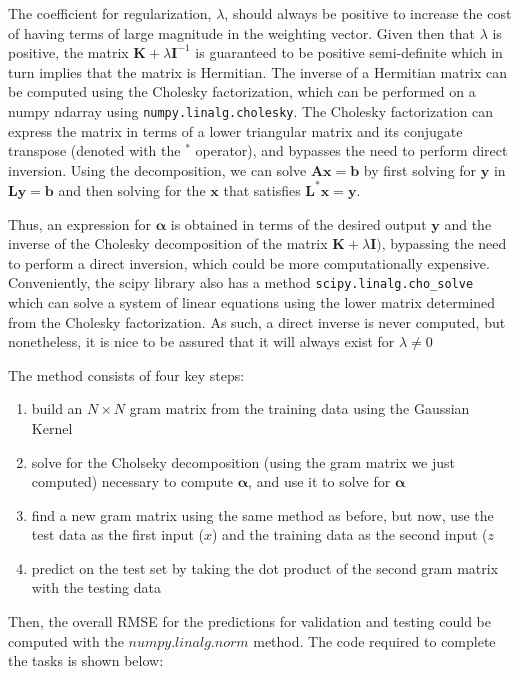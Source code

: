 \documentclass{article}
\begin{document}
The coefficient for regularization, $\lambda$, should always be positive to increase the cost of having terms of large magnitude in the weighting vector. Given then that $\lambda$ is positive, the matrix $\mathbf{K} + \lambda \mathbf{I}^{-1}$ is guaranteed to be positive semi-definite which in turn implies that the matrix is Hermitian. The inverse of a Hermitian matrix can be computed using the Cholesky factorization, which can be performed on a numpy ndarray using \verb+numpy.linalg.cholesky+. The Cholesky factorization can express the matrix in terms of a lower triangular matrix and its conjugate transpose (denoted with the $^*$ operator), and bypasses the need to perform direct inversion. Using the decomposition, we can solve $\mathbf{Ax} = \mathbf{b}$ by first solving for $\mathbf{y}$ in $\mathbf{Ly} = \mathbf{b}$ and then solving for the $\mathbf{x}$ that satisfies $\mathbf{L^{*}x} = \mathbf{y}$.

Thus, an expression for $\boldsymbol\alpha$ is obtained in terms of the desired output $\mathbf{y}$ and the inverse of the Cholesky decomposition of the matrix $\mathbf{K} + \lambda \mathbf{I})$, bypassing the need to perform a direct inversion, which could be more computationally expensive. Conveniently, the scipy library also has a method \verb+scipy.linalg.cho_solve+ which can solve a system of linear equations using the lower matrix determined from the Cholesky factorization. As such, a direct inverse is never computed, but nonetheless, it is nice to be assured that it will always exist for $\lambda \neq 0$

The method consists of four key steps:
\begin{enumerate}
\item build an $N \times N$ gram matrix from the training data using the Gaussian Kernel
\item solve for the Cholseky decomposition (using the gram matrix we just computed) necessary to compute $\boldsymbol\alpha$, and use it to solve for $\boldsymbol\alpha$
\item find a new gram matrix using the same method as before, but now, use the test data as the first input ($x$) and the training data as the second input ($z$
\item predict on the test set by taking the dot product of the second gram matrix with the testing data
\end{enumerate}

Then, the overall RMSE for the predictions for validation and testing could be computed with the $numpy.linalg.norm$ method. The code required to complete the tasks is shown below:
\end{document}
